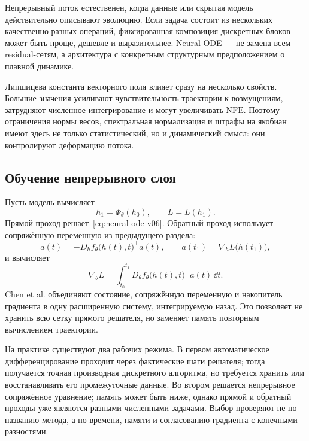\begin{caution}
Непрерывный поток естественен, когда данные или скрытая модель действительно описывают эволюцию. Если задача состоит из нескольких качественно разных операций, фиксированная композиция дискретных блоков может быть проще, дешевле и выразительнее. Neural ODE --- не замена всем residual-сетям, а архитектура с конкретным структурным предположением о плавной динамике.
\end{caution}

Липшицева константа векторного поля влияет сразу на несколько свойств. Большие значения усиливают чувствительность траектории к возмущениям, затрудняют численное интегрирование и могут увеличивать $\mathrm{NFE}$. Поэтому ограничения нормы весов, спектральная нормализация и штрафы на якобиан имеют здесь не только статистический, но и динамический смысл: они контролируют деформацию потока.

\subsection{Обучение непрерывного слоя}

Пусть модель вычисляет
\[
h_1=\Phi_\theta(h_0),
\qquad
L=L(h_1).
\]
Прямой проход решает~\eqref{eq:neural-ode-v06}. Обратный проход использует сопряжённую переменную из предыдущего раздела:
\begin{equation}
\label{eq:neural-ode-adjoint-v06}
\dot a(t)
=
-D_hf_\theta\bigl(h(t),t\bigr)^\top a(t),
\qquad
 a(t_1)=\nabla_hL\bigl(h(t_1)\bigr),
\end{equation}
и вычисляет
\begin{equation}
\label{eq:neural-ode-gradient-v06}
\nabla_\theta L
=
\int_{t_0}^{t_1}
D_\theta f_\theta\bigl(h(t),t\bigr)^\top a(t)\,\dd t.
\end{equation}
Chen et al. объединяют состояние, сопряжённую переменную и накопитель градиента в одну расширенную систему, интегрируемую назад. Это позволяет не хранить всю сетку прямого решателя, но заменяет память повторным вычислением траектории.

На практике существуют два рабочих режима. В первом автоматическое дифференцирование проходит через фактические шаги решателя; тогда получается точная производная дискретного алгоритма, но требуется хранить или восстанавливать его промежуточные данные. Во втором решается непрерывное сопряжённое уравнение; память может быть ниже, однако прямой и обратный проходы уже являются разными численными задачами. Выбор проверяют не по названию метода, а по времени, памяти и согласованию градиента с конечными разностями.

